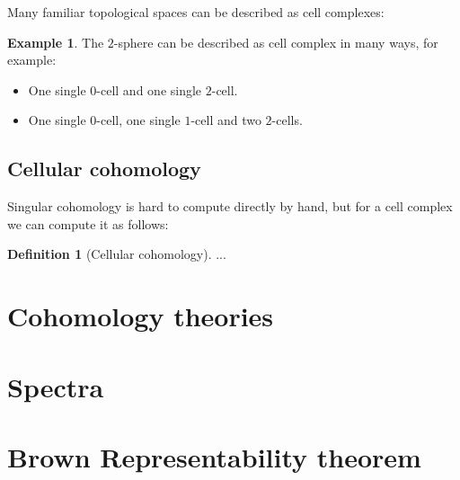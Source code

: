 \documentclass[12pt,a4paper]{amsart}
\theoremstyle{plain}
\theoremstyle{definition}
\newtheorem{defn}[thm]{Definition}
\newtheorem{exmp}[thm]{Example}
\theoremstyle{remark}
\begin{document}
Many familiar topological spaces can be described as cell complexes:

\begin{exmp}
  The $2$-sphere can be described as cell complex in many ways, for example:
  \begin{itemize}
    \item One single $0$-cell and one single $2$-cell.
    \item One single $0$-cell, one single $1$-cell and two $2$-cells.
  \end{itemize}
\end{exmp}

\subsection{Cellular cohomology}

Singular cohomology is hard to compute directly by hand, but for a cell complex we can compute it as follows:

\begin{defn}[Cellular cohomology]
  ...
\end{defn}

\section{Cohomology theories}\label{sec:cohomologies}

\section{Spectra}

\section{Brown Representability theorem}

\printbibliography
\vfill
\end{document}
